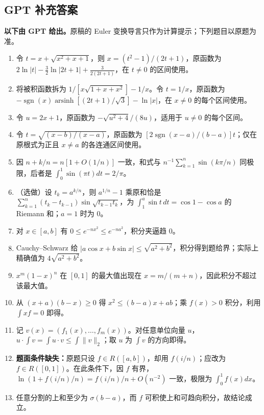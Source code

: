 \documentclass[UTF8,11pt, a4paper, oneside, fontset=none]{ctexbook}
\begin{document}
\clearpage

\subsection*{GPT 补充答案}

\noindent\textbf{以下由 GPT 给出。}原稿的 Euler 变换导言只作为计算提示；下列题目以原题为准。
\begin{enumerate}
\item 令 $t=x+\sqrt{x^2+x+1}$，则 $x=(t^2-1)/(2t+1)$，原函数为 $2\ln|t|-\frac32\ln|2t+1|+\frac3{2(2t+1)}$，在 $t\ne0$ 的区间使用。
\item 将被积函数拆为 $1/[x\sqrt{1+x+x^2}]-1/x$。令 $t=1/x$，原函数为 $-\operatorname{sgn}(x)\operatorname{arsinh}[(2t+1)/\sqrt3]-\ln|x|$，在 $x\ne0$ 的每个区间使用。
\item 令 $u=2x+1$，原函数为 $-\sqrt{u^2+4}/(8u)$，适用于 $u\ne0$ 的每个区间。
\item 令 $t=\sqrt{(x-b)/(x-a)}$，原函数为 $[2\operatorname{sgn}(x-a)/(b-a)]t$；仅在原根式为正且 $x\ne a$ 的各连通区间使用。
\item 因 $n+k/n=n[1+O(1/n)]$ 一致，和式与 $n^{-1}\sum_{k=1}^n\sin(k\pi/n)$ 同极限，后者是 $\int_0^1\sin(\pi t)dt=2/\pi$。
\item（选做）设 $t_k=a^{k/n}$，则 $a^{1/n}-1$ 乘原和恰是 $\sum_{k=1}^n(t_k-t_{k-1})\sin\sqrt{t_{k-1}t_k}$，为 $\int_1^a\sin t\,dt=\cos1-\cos a$ 的 Riemann 和；$a=1$ 时为 $0$。
\item 对 $x\in[a,b]$ 有 $0\le e^{-nx^2}\le e^{-na^2}$，积分夹逼趋 $0$。
\item Cauchy--Schwarz 给 $|a\cos x+b\sin x|\le\sqrt{a^2+b^2}$，积分得到题给界；实际上精确值为 $4\sqrt{a^2+b^2}$。
\item $x^m(1-x)^n$ 在 $[0,1]$ 的最大值出现在 $x=m/(m+n)$，因此积分不超过该最大值。
\item 从 $(x+a)(b-x)\ge0$ 得 $x^2\le(b-a)x+ab$；乘 $f(x)>0$ 积分，利用 $\int xf=0$ 即得。
\item 记 $v(x)=(f_1(x),\ldots,f_m(x))$。对任意单位向量 $u$，$u\cdot\int v=\int u\cdot v\le\int\lVert{} v\rVert_2$；取 $u$ 为 $\int v$ 的方向即得。
\item \textbf{题面条件缺失：}原题只设 $f\in R([a,b])$，却用 $f(i/n)$；应改为 $f\in R([0,1])$。在此条件下，因 $f$ 有界，$\ln(1+f(i/n)/n)=f(i/n)/n+O(n^{-2})$ 一致，极限为 $\int_0^1f(x)dx$。
\item 任意分割的上和至少为 $\sigma(b-a)$，而 $f$ 可积使上和可趋向积分，故结论成立。
\end{enumerate}
\end{document}
